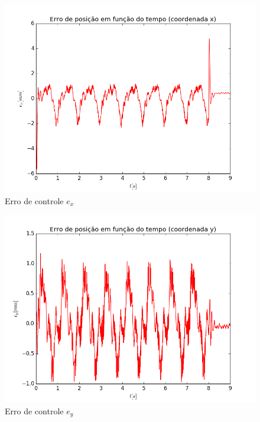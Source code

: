 \documentclass[]{politex}
\begin{document}
\begin{multicols}{2}
\begin{figure}[H]
	\centering
	\includegraphics[scale=0.39]{../../../Experimental/Aquisicoes/PIDx_circulo/ex.png}  
	\caption{Erro de controle $e_x$}
	\label{fig:PIDx_circulo_ex}
\end{figure}
\begin{figure}[H]
	\centering
	\includegraphics[scale=0.39]{../../../Experimental/Aquisicoes/PIDx_circulo/ey.png}  
	\caption{Erro de controle $e_y$}
	\label{fig:PIDx_circulo_ey}
\end{figure}
\end{multicols}
\end{document}

